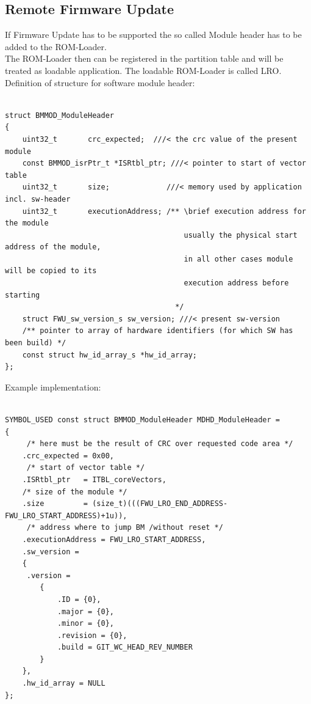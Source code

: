 \begin{landscape}

\section{Remote Firmware Update}
\label{sec:FirmwareUpdate}

If Firmware Update has to be supported the so called Module header has to be added to the ROM-Loader.\\
The ROM-Loader then can be registered in the partition table and will be treated as loadable application. The loadable ROM-Loader is called LRO.\\

Definition of structure for software module header:

\lstset{language=C}

\begin{lstlisting}[frame=single]

struct BMMOD_ModuleHeader
{
    uint32_t       crc_expected;  ///< the crc value of the present module
    const BMMOD_isrPtr_t *ISRtbl_ptr; ///< pointer to start of vector table
    uint32_t       size;             ///< memory used by application incl. sw-header
    uint32_t       executionAddress; /** \brief execution address for the module
                                         usually the physical start address of the module,
                                         in all other cases module will be copied to its
                                         execution address before starting
                                       */
    struct FWU_sw_version_s sw_version; ///< present sw-version
    /** pointer to array of hardware identifiers (for which SW has been build) */
    const struct hw_id_array_s *hw_id_array;
};

\end{lstlisting}

\newpage

Example implementation:

\begin{lstlisting}[frame=single]

SYMBOL_USED const struct BMMOD_ModuleHeader MDHD_ModuleHeader =
{
     /* here must be the result of CRC over requested code area */
    .crc_expected = 0x00, 
     /* start of vector table */
    .ISRtbl_ptr   = ITBL_coreVectors,
    /* size of the module */
    .size         = (size_t)(((FWU_LRO_END_ADDRESS-FWU_LRO_START_ADDRESS)+1u)),
     /* address where to jump BM /without reset */
    .executionAddress = FWU_LRO_START_ADDRESS,
    .sw_version =
    {
     .version =
        {
            .ID = {0},
            .major = {0},
            .minor = {0},
            .revision = {0},
            .build = GIT_WC_HEAD_REV_NUMBER
        }
    },
    .hw_id_array = NULL
};

\end{lstlisting}

\end{landscape}